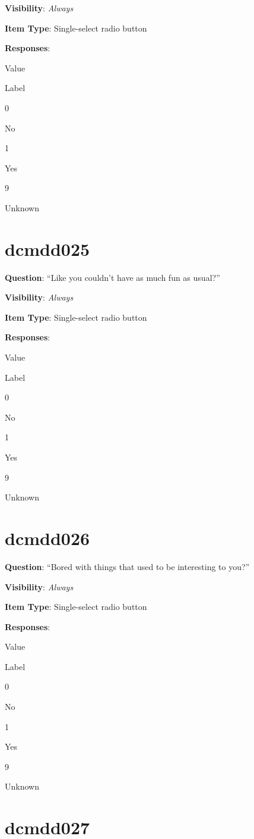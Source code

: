 \documentclass[
]{book}
\begin{document}
\textbf{Visibility}: \emph{Always}

\textbf{Item Type}: Single-select radio button

\textbf{Responses}:

Value

Label

0

No

1

Yes

9

Unknown

\hypertarget{dcmdd025}{%
\section{dcmdd025}\label{dcmdd025}}

\textbf{Question}: ``Like you couldn't have as much fun as usual?''

\textbf{Visibility}: \emph{Always}

\textbf{Item Type}: Single-select radio button

\textbf{Responses}:

Value

Label

0

No

1

Yes

9

Unknown

\hypertarget{dcmdd026}{%
\section{dcmdd026}\label{dcmdd026}}

\textbf{Question}: ``Bored with things that used to be interesting to you?''

\textbf{Visibility}: \emph{Always}

\textbf{Item Type}: Single-select radio button

\textbf{Responses}:

Value

Label

0

No

1

Yes

9

Unknown

\hypertarget{dcmdd027}{%
\section{dcmdd027}\label{dcmdd027}}
\end{document}
